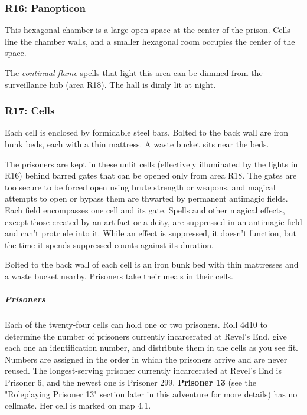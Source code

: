 \documentclass[10pt,a4paper,twoside,bg=print,twocolumn,openany,nodeprecatedcode]{dndbook}
\begin{document}
\subsubsection{R16: Panopticon}
\begin{DndReadAloud}{}
This hexagonal chamber is a large open space at the center of the prison. Cells line the chamber walls, and a smaller hexagonal room occupies the center of the space.

\end{DndReadAloud}

The \textit{continual flame} spells that light this area can be dimmed from the surveillance hub (area R18). The hall is dimly lit at night.

\subsubsection{R17: Cells}
\begin{DndReadAloud}{}
Each cell is enclosed by formidable steel bars. Bolted to the back wall are iron bunk beds, each with a thin mattress. A waste bucket sits near the beds.

\end{DndReadAloud}

The prisoners are kept in these unlit cells (effectively illuminated by the lights in R16) behind barred gates that can be opened only from area R18. The gates are too secure to be forced open using brute strength or weapons, and magical attempts to open or bypass them are thwarted by permanent antimagic fields. Each field encompasses one cell and its gate. Spells and other magical effects, except those created by an artifact or a deity, are suppressed in an antimagic field and can't protrude into it. While an effect is suppressed, it doesn't function, but the time it spends suppressed counts against its duration.

Bolted to the back wall of each cell is an iron bunk bed with thin mattresses and a waste bucket nearby. Prisoners take their meals in their cells.

\subparagraph{Prisoners}
Each of the twenty-four cells can hold one or two prisoners. Roll 4d10 to determine the number of prisoners currently incarcerated at Revel's End, give each one an identification number, and distribute them in the cells as you see fit. Numbers are assigned in the order in which the prisoners arrive and are never reused. The longest-serving prisoner currently incarcerated at Revel's End is Prisoner 6, and the newest one is Prisoner 299. \textbf{Prisoner 13} (see the "Roleplaying Prisoner 13" section later in this adventure for more details) has no cellmate. Her cell is marked on map 4.1.
\end{document}
